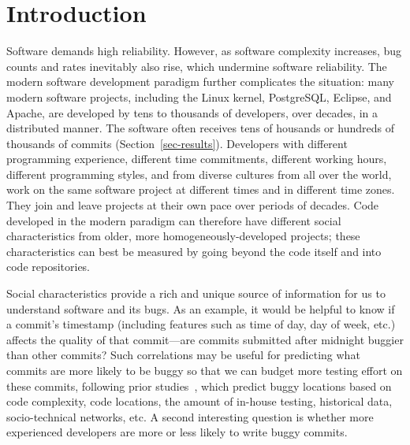 \section{Introduction}

Software demands high reliability. However, as software complexity increases, 
bug counts and rates inevitably also rise, which undermine software reliability.
The modern software development paradigm further complicates the situation: 
many modern software projects, including the Linux kernel, PostgreSQL, 
Eclipse, and Apache,
are developed by tens to thousands of developers, over decades, %
in a distributed manner. The software often receives tens of housands or hundreds of thousands 
of commits (Section~\ref{sec-results}). 
Developers with different programming experience, 
different time commitments, different working hours, different programming styles, and from diverse cultures from all over the world,
work on the same software project at different times and in different time zones. They join and leave projects 
at their own pace over periods of decades. 
Code developed in the modern paradigm can therefore have different 
social characteristics from older, more homogeneously-developed projects;
these characteristics can best be measured by going beyond the code itself and 
into code repositories.

Social characteristics provide a rich and unique source of information for us to 
understand software and its bugs. As an example, it would be helpful to know if  
a commit's timestamp (including features such as time of day, day of week, etc.) affects the quality of that commit---are commits submitted after midnight buggier than other commits? 
Such correlations may be useful for predicting what commits are more likely
to be buggy so that we can budget more testing effort on these commits, following prior 
studies~\cite{graves00predicting, guo04robust, Hassan09, libre07, devNetwork08, predictionMenzies10, effort03, ostrand05predicting, 
depGraph08, zimmermann-promise-2007},
which predict buggy locations based on code complexity, 
code locations, the amount of in-house testing, historical data, socio-technical networks, etc. 
A second interesting question is whether more experienced developers are more or less
likely to write buggy commits. 




